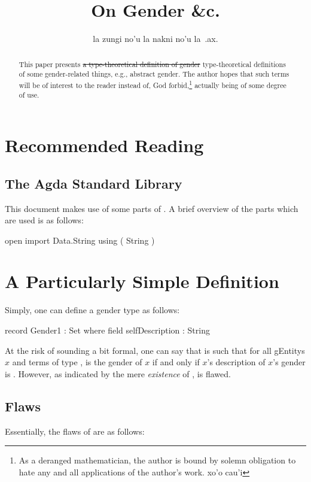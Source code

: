 \documentclass{article}
\title{On Gender \&c.}
\author{la zungi no'u la nakni no'u la\ .ax.}
\begin{document}
\maketitle{}

\begin{abstract}
\sloppypar{}
This paper presents \st{a type-theoretical definition of gender} type-theoretical definitions of some gender-related things, e.g., abstract gender.  The author hopes that such terms will be of interest to the reader instead of, God forbid,\footnote{As a deranged mathematician, the author is bound by solemn obligation to hate any and all applications of the author's work.  xo'o cau'i} actually being of some degree of use.
\end{abstract}

\section{Recommended Reading}

\subsection{The Agda Standard Library}
This document makes use of some parts of \textcite{agdaStdlib}.  A brief overview of the parts which are used is as follows:

\begin{code}
open import Data.String
  using
    ( String
    )
\end{code}

\section{A Particularly Simple Definition}
Simply, one can define a gender type  as follows:

\begin{code}
record Gender1 : Set where
  field
    selfDescription : String
\end{code}

At the risk of sounding a bit formal, one can say that  is such that for all \glspl{gEntity} \(x\) and terms  of type ,  is the gender of \(x\) if and only if \(x\)'s description of \(x\)'s gender is  .  However, as indicated by the mere \emph{existence} of ,  is flawed.

\subsection{Flaws}\label{sec:gender1flaws}
Essentially, the flaws of  are as follows:
\end{document}
